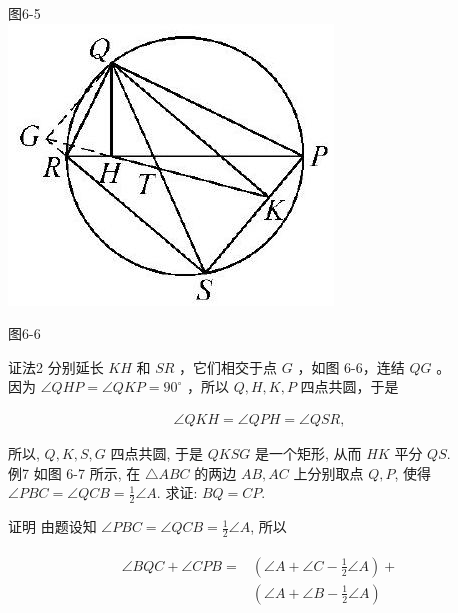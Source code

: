 \documentclass[10pt]{article}
\begin{document}
图6-5\\
\includegraphics[max width=\textwidth, center]{2024_10_30_66b8e5e701da2093c133g-046}

图6-6

证法2 分别延长 $K H$ 和 $S R$ ，它们相交于点 $G$ ，如图 6-6，连结 $Q G$ 。\\
因为 $\angle Q H P=\angle Q K P=90^{\circ}$ ，所以 $Q, H, K, P$ 四点共圆，于是

\begin{align*}
\angle Q K H=\angle Q P H=\angle Q S R,
\end{align*}

所以, $Q, K, S, G$ 四点共圆, 于是 $Q K S G$ 是一个矩形, 从而 $H K$ 平分 $Q S$.\\
例7 如图 6-7 所示, 在 $\triangle A B C$ 的两边 $A B, A C$ 上分别取点 $Q, P$, 使得 $\angle P B C=\angle Q C B=\frac{1}{2} \angle A$. 求证: $B Q=C P$.

证明 由题设知 $\angle P B C=\angle Q C B=\frac{1}{2} \angle A$, 所以

\begin{align*}
\begin{aligned}
\angle B Q C+\angle C P B= & \left(\angle A+\angle C-\frac{1}{2} \angle A\right)+ \\
& \left(\angle A+\angle B-\frac{1}{2} \angle A\right)
\end{aligned}
\end{align*}
\end{document}
